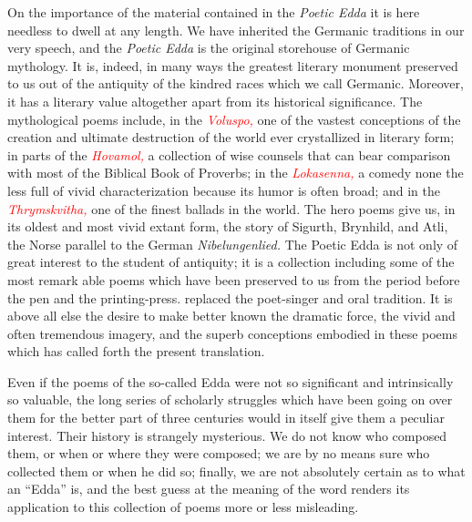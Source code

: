 \documentclass{scrbook}
\newcommand{\chapterref}[1]{\textcolor{red}{\emph{#1}}}
\newcommand{\chapterref}[1]{\hyperref[cha:#1]{\emph{#1}}}
\begin{document}
On the importance of the material contained in the \emph{Poetic Edda} it is here needless to dwell at any length. We have inherited the Germanic traditions in our very speech, and the \emph{Poetic Edda} is the original storehouse of Germanic mythology. It is, indeed, in many ways the greatest literary monument preserved to us out of the antiquity of the kindred races which we call Germanic. Moreover, it has a literary value altogether apart from its historical significance. The mythological poems include, in the \chapterref{Voluspo,} one of the vastest conceptions of the creation and ultimate destruction of the world ever crystallized in literary form; in parts of the \chapterref{Hovamol,} a collection of wise counsels that can bear comparison with most of the Biblical Book of Proverbs; in the \chapterref{Lokasenna,} a comedy none the less full of vivid characterization because its humor is often broad; and in the \chapterref{Thrymskvitha,} one of the finest ballads in the world. The hero poems give us, in its oldest and most vivid extant form, the story of Sigurth, Brynhild, and Atli, the Norse parallel to the German \emph{Nibelungenlied.} The Poetic Edda is not only of great interest to the student of antiquity; it is a collection including some of the most remark able poems which have been preserved to us from the period before the pen and the printing-press. replaced the poet-singer and oral tradition. It is above all else the desire to make better known the dramatic force, the vivid and often tremendous imagery, and the superb conceptions embodied in these poems which has called forth the present translation.


Even if the poems of the so-called Edda were not so significant and intrinsically so valuable, the long series of scholarly struggles which have been going on over them for the better part of three centuries would in itself give them a peculiar interest. Their history is strangely mysterious. We do not know who composed them, or when or where they were composed; we are by no means sure who collected them or when he did so; finally, we are not absolutely certain as to what an ``Edda'' is, and the best guess at the meaning of the word renders its application to this collection of poems more or less misleading.
\end{document}
